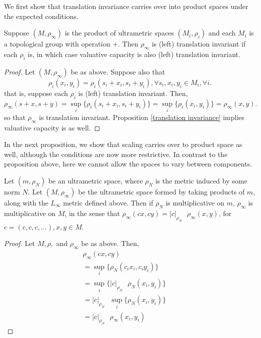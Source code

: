 We first show that translation invariance carries over into product spaces under the expected conditions. 

\begin{proposition}
Suppose $(M,\rho_\infty)$ is the product of ultrametric spaces $(M_i, \rho_i)$ and each $M_i$ is a topological group with operation $+$. Then $\rho_\infty$ is (left) translation invariant if each $\rho_i$ is, in which case valuative capacity is also (left) translation invariant.
\end{proposition}

\begin{proof}
Let $(M,\rho_\infty)$ be as above. Suppose also that \[\rho_i(x_i,y_i) = \rho_i(s_i + x_i, s_i +y_i), \forall s_i, x_i, y_i \in M_i, \forall i.\] that is, suppose each $\rho_i$ is (left) translation invariant. Then,  
\[
\rho_\infty(s +x, s+y)  
= \sup_i\{\rho_i(s_i +x_i, s_i + y_i)\} 
= \sup_i\{\rho_i(x_i, y_i)\}
= \rho_\infty(x,y).
\] so that $\rho_\infty$ is translation invariant.  Proposition \ref{translation invariance} implies valuative capacity is as well. 
\end{proof}

In the next proposition, we show that scaling carries over to product space as well, although the conditions are now more restrictive. In contrast to the proposition above, here  we cannot allow the spaces to vary between components.

\begin{proposition}
Let $(m, \rho_N)$ be an ultrametric space, where $\rho_N$ is the metric induced by some norm $N$. Let $(M, \rho_{\infty})$ be the ultrametric space formed by taking products of $m$, along with the $L_\infty$ metric defined above.  Then if $\rho_N$ is multiplicative on $m$, $\rho_{\infty}$ is multiplicative on $M$, in the sense that $\rho_{\infty}(cx,cy) = \lvert c\rvert_{\rho_N} \text{ } \rho_\infty (x,y)$, for $c=(c,c,c,\ldots), x,y \in M$.
\end{proposition}

\begin{proof}
Let $M, \rho,$ and $\rho_{\infty}$ be as above. Then, 
\begin{align*}
\rho_\infty(cx, cy) && \\
= \sup_i\{\rho_N(c_i x_i, c_i y_i)\} && \\
= \sup_i\{\vert c \rvert_{\rho_N} \text{ }  \rho_N(x_i, y_i)\} && \\
= \vert c \rvert_{\rho_N} \text{ } \sup_i\{\rho_N(x_i,y_i)\} && \\
= \vert c \rvert_{\rho_N} \text{ } \rho_\infty(x_i,y_i)
\end{align*}
\end{proof}

